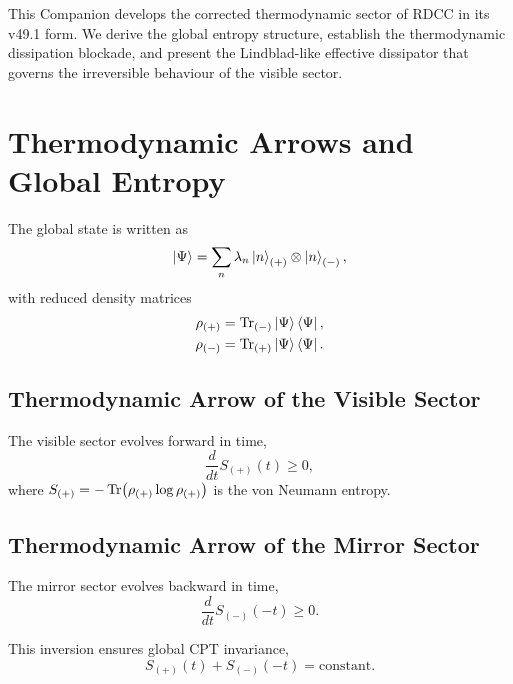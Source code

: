 \documentclass[11pt,a4paper]{article}
\begin{document}
This Companion develops the corrected thermodynamic sector of RDCC in its
v49.1 form. We derive the global entropy structure, establish the thermodynamic
dissipation blockade, and present the Lindblad-like effective dissipator that
governs the irreversible behaviour of the visible sector.

\section[Thermodynamic Arrows and Global Entropy]{Thermodynamic Arrows and Global Entropy}

The global state is written as
\begin{equation}
\ket{\Psi} = \sum_n \lambda_n \ket{n}_{(+)} \otimes \ket{n}_{(-)},
\end{equation}
with reduced density matrices
\begin{align}
\rho_{(+)} &= \Tr_{(-)} \ket{\Psi}\bra{\Psi}, \\
\rho_{(-)} &= \Tr_{(+)} \ket{\Psi}\bra{\Psi}.
\end{align}

\subsection[Thermodynamic Arrow of the Visible Sector]{Thermodynamic Arrow of the Visible Sector}

The visible sector evolves forward in time,
\begin{equation}
\frac{d}{dt} S_{(+)}(t) \ge 0,
\end{equation}
where $S_{(+)} = -\Tr(\rho_{(+)} \log \rho_{(+)})$ is the von Neumann entropy.

\subsection[Thermodynamic Arrow of the Mirror Sector]{Thermodynamic Arrow of the Mirror Sector}

The mirror sector evolves backward in time,
\begin{equation}
\frac{d}{dt} S_{(-)}(-t) \ge 0.
\end{equation}

This inversion ensures global CPT invariance,
\begin{equation}
S_{(+)}(t) + S_{(-)}(-t) = \text{constant}.
\end{equation}
\end{document}
